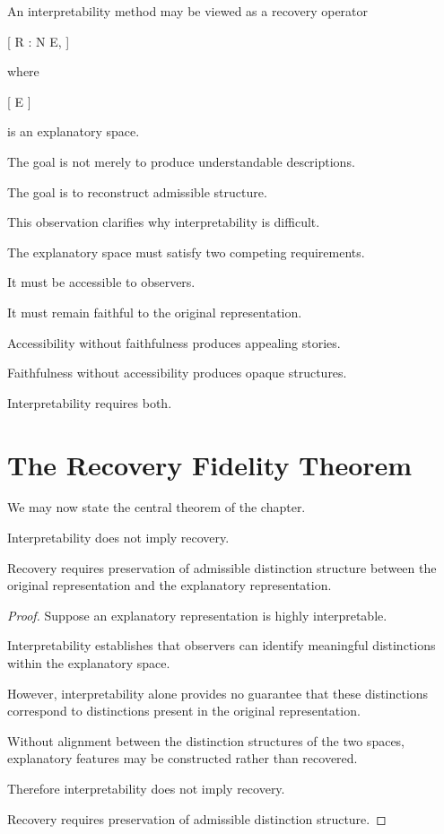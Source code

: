 \documentclass[11pt,oneside,openany]{book}
\begin{document}
An interpretability method may be viewed as a recovery operator

[
R
:
\mathcal N
\rightarrow
\mathcal E,
]

where

[
\mathcal E
]

is an explanatory space.

The goal is not merely to produce understandable descriptions.

The goal is to reconstruct admissible structure.

This observation clarifies why interpretability is difficult.

The explanatory space must satisfy two competing requirements.

It must be accessible to observers.

It must remain faithful to the original representation.

Accessibility without faithfulness produces appealing stories.

Faithfulness without accessibility produces opaque structures.

Interpretability requires both.

\section{The Recovery Fidelity Theorem}

We may now state the central theorem of the chapter.

\begin{theorem}

Interpretability does not imply recovery.

Recovery requires preservation of admissible distinction structure between the original representation and the explanatory representation.

\end{theorem}

\begin{proof}

Suppose an explanatory representation is highly interpretable.

Interpretability establishes that observers can identify meaningful distinctions within the explanatory space.

However, interpretability alone provides no guarantee that these distinctions correspond to distinctions present in the original representation.

Without alignment between the distinction structures of the two spaces, explanatory features may be constructed rather than recovered.

Therefore interpretability does not imply recovery.

Recovery requires preservation of admissible distinction structure.

\end{proof}
\end{document}
